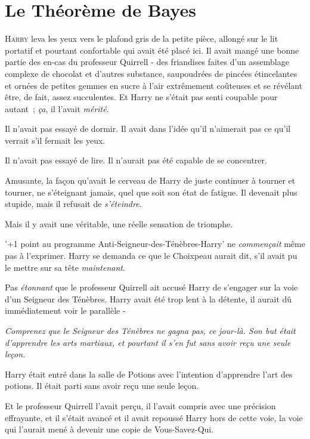 \chapter{Le Théorème de Bayes}

\lettrine{H}{arry} leva les yeux vers le plafond gris de la petite pièce, allongé sur le lit portatif et pourtant confortable qui avait été placé ici. Il avait mangé une bonne partie des en-cas du professeur Quirrell - des friandises faites d'un assemblage complexe de chocolat et d'autres substance, saupoudrées de pincées étincelantes et ornées de petites gemmes en sucre à l'air extrêmement coûteuses et se révélant être, de fait, assez succulentes. Et Harry ne s'était pas senti coupable pour autant~; \emph{ça}, il l'avait \emph{mérité}.

Il n'avait pas essayé de dormir. Il avait dans l'idée qu'il n'aimerait pas ce qu'il verrait s'il fermait les yeux.

Il n'avait pas essayé de lire. Il n'aurait pas été capable de se concentrer.

Amusante, la façon qu'avait le cerveau de Harry de juste continuer à tourner et tourner, ne s'éteignant jamais, quel que soit son état de fatigue. Il devenait plus stupide, mais il refusait de \emph{s'éteindre}.

Mais il y avait une véritable, une réelle sensation de triomphe.

'+1 point au programme Anti-Seigneur-des-Ténèbres-Harry' ne \emph{commençait} même pas à l'exprimer. Harry se demanda ce que le Choixpeau aurait dit, s'il avait pu le mettre sur sa tête \emph{maintenant}.

Pas \emph{étonnant} que le professeur Quirrell ait accusé Harry de s'engager sur la voie d'un Seigneur des Ténèbres. Harry avait été trop lent à la détente, il aurait dû immédiatement voir le parallèle -

\emph{Comprenez que le Seigneur des Ténèbres ne gagna pas, ce jour-là. Son but était d'apprendre les arts martiaux, et pourtant il s'en fut sans avoir reçu une seule leçon.}

Harry était entré dans la salle de Potions avec l'intention d'apprendre l'art des potions. Il était parti sans avoir reçu une seule leçon.

Et le professeur Quirrell l'avait perçu, il l'avait compris avec une précision effrayante, et il s'était avancé et il avait repoussé Harry hors de cette voie, la voie qui l'aurait mené à devenir une copie de Vous-Savez-Qui.

